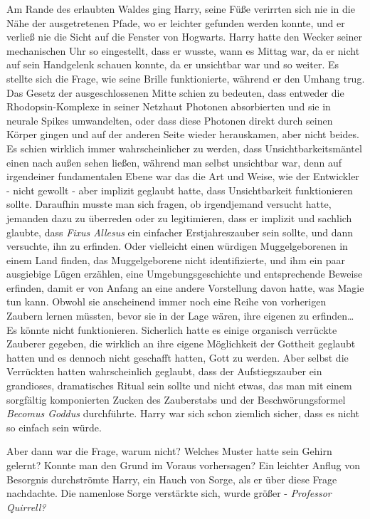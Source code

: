 {Am Rande des erlaubten Waldes ging Harry, seine Füße verirrten sich nie in die Nähe der ausgetretenen Pfade, wo er leichter gefunden werden konnte, und er verließ nie die Sicht auf die Fenster von Hogwarts. Harry hatte den Wecker seiner mechanischen Uhr so eingestellt, dass er wusste, wann es Mittag war, da er nicht auf sein Handgelenk schauen konnte, da er unsichtbar war und so weiter. Es stellte sich die Frage, wie seine Brille funktionierte, während er den Umhang trug. Das Gesetz der ausgeschlossenen Mitte schien zu bedeuten, dass entweder die Rhodopsin-Komplexe in seiner Netzhaut Photonen absorbierten und sie in neurale Spikes umwandelten, oder dass diese Photonen direkt durch seinen Körper gingen und auf der anderen Seite wieder herauskamen, aber nicht beides. Es schien wirklich immer wahrscheinlicher zu werden, dass Unsichtbarkeitsmäntel einen nach außen sehen ließen, während man selbst unsichtbar war, denn auf irgendeiner fundamentalen Ebene war das die Art und Weise, wie der Entwickler - nicht gewollt - aber implizit geglaubt hatte, dass Unsichtbarkeit funktionieren sollte. Daraufhin musste man sich fragen, ob irgendjemand versucht hatte, jemanden dazu zu überreden oder zu legitimieren, dass er implizit und sachlich glaubte, dass \emph{Fixus Allesus} ein einfacher Erstjahreszauber sein sollte, und dann versuchte, ihn zu erfinden. Oder vielleicht einen würdigen Muggelgeborenen in einem Land finden, das Muggelgeborene nicht identifizierte, und ihm ein paar ausgiebige Lügen erzählen, eine Umgebungsgeschichte und entsprechende Beweise erfinden, damit er von Anfang an eine andere Vorstellung davon hatte, was Magie tun kann. Obwohl sie anscheinend immer noch eine Reihe von vorherigen Zaubern lernen müssten, bevor sie in der Lage wären, ihre eigenen zu erfinden… Es könnte nicht funktionieren. Sicherlich hatte es einige organisch verrückte Zauberer gegeben, die wirklich an ihre eigene Möglichkeit der Gottheit geglaubt hatten und es dennoch nicht geschafft hatten, Gott zu werden. Aber selbst die Verrückten hatten wahrscheinlich geglaubt, dass der Aufstiegszauber ein grandioses, dramatisches Ritual sein sollte und nicht etwas, das man mit einem sorgfältig komponierten Zucken des Zauberstabs und der Beschwörungsformel \emph{Becomus Goddus} durchführte. Harry war sich schon ziemlich sicher, dass es nicht so einfach sein würde.

Aber dann war die Frage, warum nicht? Welches Muster hatte sein Gehirn gelernt? Konnte man den Grund im Voraus vorhersagen? Ein leichter Anflug von Besorgnis durchströmte Harry, ein Hauch von Sorge, als er über diese Frage nachdachte. Die namenlose Sorge verstärkte sich, wurde größer - \emph{Professor Quirrell?}

}
